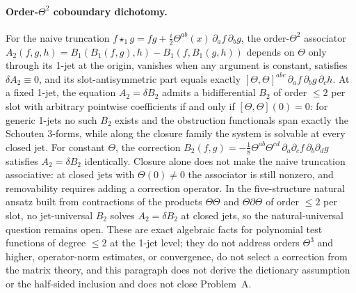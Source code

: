 \paragraph{Order-\(\Theta^2\) coboundary dichotomy.} For the naive truncation \(f\star_1 g=fg+\tfrac{i}{2}\Theta^{ab}(x)\,\partial_af\,\partial_bg\), the order-\(\Theta^2\) associator \(A_2(f,g,h)=B_1(B_1(f,g),h)-B_1(f,B_1(g,h))\) depends on \(\Theta\) only through its 1-jet at the origin, vanishes when any argument is constant, satisfies \(\delta A_2\equiv0\), and its slot-antisymmetric part equals exactly \([\Theta,\Theta]^{abc}\,\partial_af\,\partial_bg\,\partial_ch\). At a fixed 1-jet, the equation \(A_2=\delta B_2\) admits a bidifferential \(B_2\) of order \(\le2\) per slot with arbitrary pointwise coefficients if and only if \([\Theta,\Theta](0)=0\): for generic 1-jets no such \(B_2\) exists and the obstruction functionals span exactly the Schouten 3-forms, while along the closure family the system is solvable at every closed jet. For constant \(\Theta\), the correction \(B_2(f,g)=-\tfrac{1}{8}\Theta^{ab}\Theta^{cd}\,\partial_a\partial_c f\,\partial_b\partial_d g\) satisfies \(A_2=\delta B_2\) identically. Closure alone does not make the naive truncation associative: at closed jets with \(\Theta(0)\neq0\) the associator is still nonzero, and removability requires adding a correction operator. In the five-structure natural ansatz built from contractions of the products \(\Theta\Theta\) and \(\Theta\partial\Theta\) of order \(\le2\) per slot, no jet-universal \(B_2\) solves \(A_2=\delta B_2\) at closed jets, so the natural-universal question remains open. These are exact algebraic facts for polynomial test functions of degree \(\le2\) at the 1-jet level; they do not address orders \(\Theta^3\) and higher, operator-norm estimates, or convergence, do not select a correction from the matrix theory, and this paragraph does not derive the dictionary assumption or the half-sided inclusion and does not close Problem~A.
